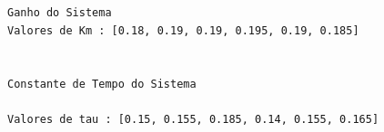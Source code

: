 \documentclass[11pt]{article}
\begin{document}
    \begin{Verbatim}[commandchars=\\\{\}]


Ganho do Sistema
Valores de Km : [0.18, 0.19, 0.19, 0.195, 0.19, 0.185]


Constante de Tempo do Sistema

Valores de tau : [0.15, 0.155, 0.185, 0.14, 0.155, 0.165]
    \end{Verbatim}

    \begin{center}
    \end{center}
    { \hspace*{\fill} \\}
    
\end{document}
